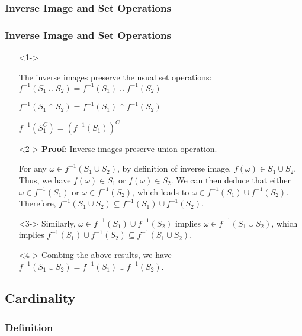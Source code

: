 \documentclass[handout]{beamer}
\begin{document}
\subsubsection{Inverse Image and Set Operations}
\frame
{
  \frametitle{Inverse Image and Set Operations}

\begin{itemize}

\item [] <1-> \begin{Theorem} The inverse images preserve the usual set operations:
$f^{-1}(S_1\cup S_2)=f^{-1}(S_1)\cup f^{-1}(S_2)$

$f^{-1}(S_1\cap S_2)=f^{-1}(S_1)\cap f^{-1}(S_2)$ 

$f^{-1}(S_1^C)= (f^{-1}(S_1))^C$
\end{Theorem}

\item [] <2->  \textbf{Proof}: Inverse images preserve union operation.

For any $\omega\in f^{-1}(S_1\cup S_2)$, by definition of inverse image, $f(\omega)\in S_1\cup S_2$. Thus, we have $f(\omega) \in S_1$ or $f(\omega) \in S_2$. We can then deduce that  either $\omega\in f^{-1}(S_1)$ or $\omega \in f^{-1}(S_2)$, which leads to $\omega \in f^{-1}(S_1)\cup  f^{-1}(S_2)$.  Therefore, $f^{-1}(S_1\cup S_2)\subseteq f^{-1}(S_1)\cup f^{-1}(S_2)$. 

\item [] <3-> Similarly, $\omega\in f^{-1}(S_1)\cup f^{-1}(S_2)$ implies $\omega\in f^{-1}(S_1\cup S_2)$, which implies $ f^{-1}(S_1)\cup f^{-1}(S_2) \subseteq f^{-1}(S_1\cup S_2)$. 

\item [] <4->  Combing the above results, we have $f^{-1}(S_1\cup S_2)= f^{-1}(S_1)\cup f^{-1}(S_2)$.

\end{itemize}

}



\subsection{Cardinality}
\subsubsection{Definition}
\end{document}
